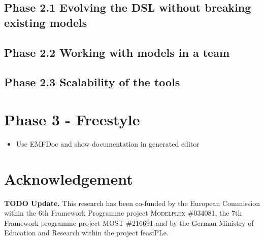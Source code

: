 \documentclass[10pt, pdftex]{llncs}
\newcommand{\todo}[1]{\color{red}\textbf{TODO #1}\color{black}}
\begin{document}
\subsection{Phase 2.1 Evolving the DSL without breaking existing models}

\subsection{Phase 2.2 Working with models in a team}

\subsection{Phase 2.3 Scalability of the tools}

\section{Phase 3 - Freestyle}

\begin{itemize}
  \item Use EMFDoc and show documentation in generated editor
\end{itemize}

\section*{Acknowledgement}
\small
	\todo{Update.}
    This research has been co-funded by the European Commission within the 6th Framework Programme project
    \textsc{Modelplex} \#034081, the 7th Framework programme project
    \textsc{MOST} \#216691 and by the German Ministry of Education and Research
    within the project feasiPLe.




\end{document}

